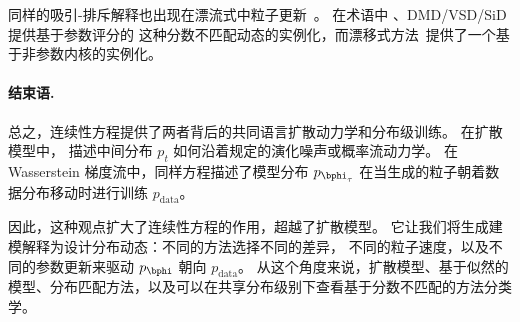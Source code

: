 同样的吸引-排斥解释也出现在漂流式中粒子更新~\citep{weber2023the,deng2026generative}。  在术语中
\citet{lai2026unified}、DMD/VSD/SiD 提供基于参数评分的
这种分数不匹配动态的实例化，而漂移式方法~\citep{weber2023the,deng2026generative}提供了一个基于非参数内核的实例化。


\paragraph{结束语.}
总之，连续性方程提供了两者背后的共同语言扩散动力学和分布级训练。  在扩散模型中，
描述中间分布 $p_t$ 如何沿着规定的演化噪声或概率流动力学。  在 Wasserstein 梯度流中，同样方程描述了模型分布 $p_{\bphi_\tau}$ 在当生成的粒子朝着数据分布移动时进行训练
$p_{\mathrm{data}}$。

因此，这种观点扩大了连续性方程的作用，超越了扩散模型。  它让我们将生成建模解释为设计分布动态：不同的方法选择不同的差异，
不同的粒子速度，以及不同的参数更新来驱动
$p_{\bphi}$ 朝向 $p_{\mathrm{data}}$。  从这个角度来说，扩散模型、基于似然的模型、分布匹配方法，以及可以在共享分布级别下查看基于分数不匹配的方法分类学。



